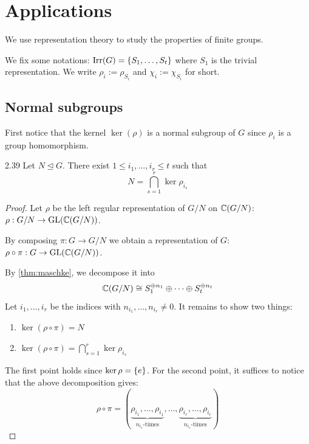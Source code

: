 \documentclass[twoside = false,	%
		headsepline,		%
		parskip = true,
		]{scrbook}						%
\begin{document}
\section{Applications}

    We use representation theory to study the properties of finite groups.

    We fix some notations: $\mathrm{Irr}(G)=\left\{ S_1,\dots, S_t\right\}$ where $S_1$ is the trivial representation. We write $\rho_i:=\rho_{S_i}$ and $\chi_i:= \chi_{S_i}$ for short.
    \subsection{Normal subgroups}

        First notice that the kernel $\ker(\rho)$ is a normal subgroup of $G$ since $\rho_i$ is a group homomorphism.
        
        \begin{proposition}{}{2.39}
            Let $N\trianglelefteq G$. There exist $1\leq i_1,\dots, i_r\leq t$ such that $$N=\bigcap_{s=1}^r\ker\rho_{i_s}$$ 
        \end{proposition}
    
        \begin{proof}
            Let $\rho$ be the left regular representation of $G/N$ on $\mathbb C(G/N)$: $\rho: G/N\to\mathrm{GL}(\mathbb C(G/N))$.
    
            By composing $\pi:G\to G/N$ we obtain a representation of $G$: $\rho\circ \pi: G\to\mathrm{GL}(\mathbb C(G/N))$.
    
            By \ref{thm:maschke}, we decompose it into $$\mathbb C(G/N)\cong S_1^{\oplus n_1} \oplus \dots \oplus S_t^{\oplus n_t}$$
            Let $i_1,\dots,i_r$ be the indices with $n_{i_1},\dots,n_{i_r}\neq 0$. It remains to show two things:
            \begin{enumerate}
                \item $\ker(\rho\circ \pi)=N$
                \item $\ker(\rho\circ\pi)=\bigcap_{s=1}^r\ker\rho_{i_s}$
            \end{enumerate} 
            
            The first point holds since $\ker\rho=\left\{ e\right\}$. For the second point, it suffices to notice that the above decomposition gives:
            $$\rho\circ\pi=(\underbrace{\rho_{i_1},\dots, \rho_{i_1}}_{n_{i_1}\text{-times}}, \dots, \underbrace{\rho_{i_r},\dots, \rho_{i_r}}_{n_{i_r}\text{-times}})$$
        \end{proof}
    
\end{document}
